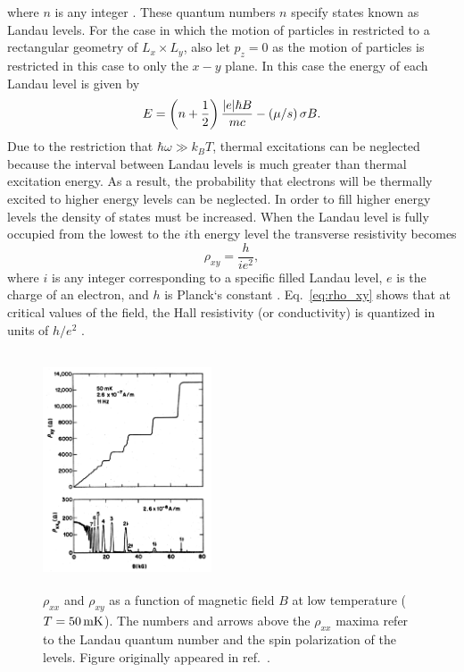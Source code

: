 where $n$ is any integer \cite{Landau_Quantum1965}. These quantum numbers $n$ specify states known as Landau levels. For the case in which the motion of particles in restricted to a rectangular geometry of $L_x \times L_y$, also let $p_z=0$ as the motion of particles is restricted in this case to only the $x-y$ plane. In this case the energy of each Landau level is given by 
\begin{equation}\label{eq:landau_levels_2D}
	E = \left(n+\frac{1}{2}\right)\frac{\abs{e}\hbar B}{mc} - \left(\mu/s\right)\sigma B.
\end{equation}
Due to the restriction that $\hbar\omega \gg k_B T$, thermal excitations can be neglected because the interval between Landau levels is much greater than thermal excitation energy. As a result, the probability that electrons will be thermally excited to higher energy levels can be neglected. In order to fill higher energy levels the density of states must be increased. When the Landau level is fully occupied from the lowest to the $i\mathrm{th}$ energy level the transverse resistivity becomes
\begin{equation}\label{eq:rho_xy}
	\rho_{xy} = \frac{h}{i e^2},
\end{equation}
where $i$ is any integer corresponding to a specific filled Landau level, $e$ is the charge of an electron, and $h$ is Planck`s constant \cite{Klitzing_PhysRevLett1980,Goerbig_2009}. Eq.~\ref{eq:rho_xy} shows that at critical values of the field, the Hall resistivity (or conductivity) is quantized in units of $h/e^2$ \cite{Kittel_IntroSolidState2005,Hook_Solid1991}. 
\begin{figure}[ht]
	\centering
	\includegraphics[height=7cm,width=5cm]{figs/future/IQHE_data_RHOxy_RHOxx}
	\caption[Example data of the Integer Quantum Hall Effect]{$\rho_{xx}$ and $\rho_{xy}$ as a function of magnetic field $B$ at low temperature ($T=50\,\mathrm{mK}$). The numbers and arrows above the $\rho_{xx}$ maxima refer to the Landau quantum number and the spin polarization of the levels. Figure originally appeared in ref.~\cite{Paalanen_PhysRevB1982}.}
	\label{fig:IQHE_data}
\end{figure}

